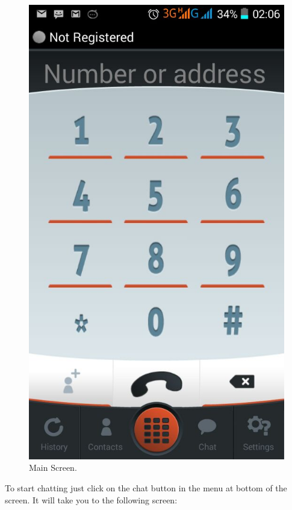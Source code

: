 \documentclass[a4paper]{article}
\begin{document}
\begin{center}
\begin{figure}[H]
\centering

\includegraphics[width=0.4\linewidth]{pictures/home.png}

\caption{\label{fig:Screen1}Main Screen.}
\end{figure}
\end{center}

%
%
%
%

To start chatting just click on the chat button in the menu at bottom of the screen. It will take you to the following screen:
\end{document}
